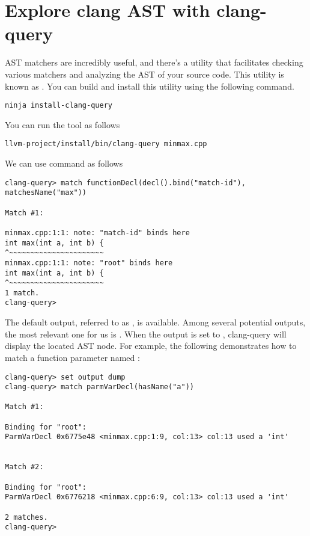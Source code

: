 \section{Explore clang AST with clang-query}
AST matchers are incredibly useful, and there's a utility that facilitates
checking various matchers and analyzing the AST of your source code. This
utility is known as . You can build and install this
utility using the following command. 
\begin{adjustwidth}{0em}{0em}
\begin{verbatim}
ninja install-clang-query
\end{verbatim}
\end{adjustwidth}
You can run the tool as follows
\begin{adjustwidth}{0em}{0em}
\begin{verbatim}
llvm-project/install/bin/clang-query minmax.cpp
\end{verbatim}
\end{adjustwidth}
We can use  command as follows

\begin{adjustwidth}{0em}{0em}
\begin{verbatim}
clang-query> match functionDecl(decl().bind("match-id"), matchesName("max"))

Match #1:

minmax.cpp:1:1: note: "match-id" binds here
int max(int a, int b) {
^~~~~~~~~~~~~~~~~~~~~~~
minmax.cpp:1:1: note: "root" binds here
int max(int a, int b) {
^~~~~~~~~~~~~~~~~~~~~~~
1 match.
clang-query> 
\end{verbatim}
\end{adjustwidth}

The default output, referred to as , is available. Among several
potential outputs, the most relevant one for us is . When the
output is set to , clang-query will display the located AST
node. For example, the following demonstrates how to match a function parameter
named : 

\begin{adjustwidth}{0em}{0em}
\begin{verbatim}
clang-query> set output dump
clang-query> match parmVarDecl(hasName("a"))

Match #1:

Binding for "root":
ParmVarDecl 0x6775e48 <minmax.cpp:1:9, col:13> col:13 used a 'int'


Match #2:

Binding for "root":
ParmVarDecl 0x6776218 <minmax.cpp:6:9, col:13> col:13 used a 'int'

2 matches.
clang-query>
\end{verbatim}
\end{adjustwidth}

